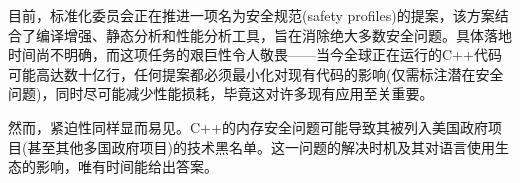 目前，标准化委员会正在推进一项名为安全规范(safety profiles)的提案，该方案结合了编译增强、静态分析和性能分析工具，旨在消除绝大多数安全问题。具体落地时间尚不明确，而这项任务的艰巨性令人敬畏——当今全球正在运行的C++代码可能高达数十亿行，任何提案都必须最小化对现有代码的影响(仅需标注潜在安全问题)，同时尽可能减少性能损耗，毕竟这对许多现有应用至关重要。

然而，紧迫性同样显而易见。C++的内存安全问题可能导致其被列入美国政府项目(甚至其他多国政府项目)的技术黑名单。这一问题的解决时机及其对语言使用生态的影响，唯有时间能给出答案。